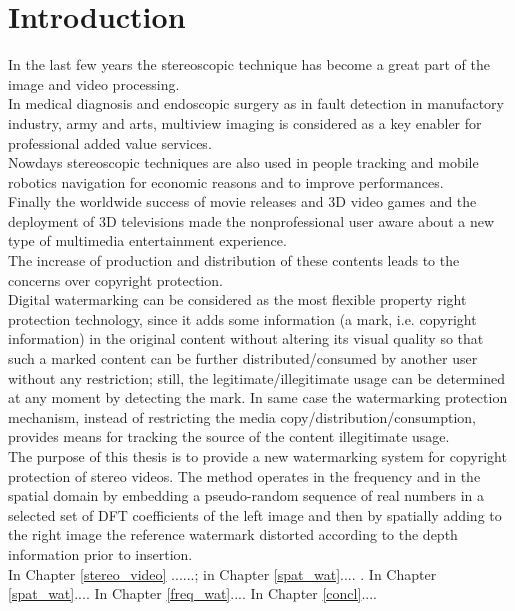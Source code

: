 \chapter*{Introduction}
\label{intro}
{}

In the last few years the stereoscopic technique has become a great part of the image and video processing.\\
In medical diagnosis and endoscopic surgery as in fault detection in manufactory industry, army and arts,
multiview imaging is considered as a key enabler  for professional added value services.\\
Nowdays stereoscopic techniques are also used in people tracking and mobile robotics
navigation for economic reasons and to improve performances.\\
Finally the worldwide success of movie releases and  3D video games and the deployment of 3D televisions made the nonprofessional user aware about a new type of multimedia entertainment experience.\\
The increase of production and distribution of these contents leads to the concerns over copyright protection.\\
Digital watermarking can be considered as the most flexible property right protection technology, since it adds some information (a mark, i.e. copyright information) in the
original content without altering its visual quality so that such a marked content can be further distributed/consumed by another user without any restriction; still, the legitimate/illegitimate usage can be determined at any moment by detecting the mark. In same case the watermarking protection mechanism, instead of restricting the media copy/distribution/consumption, provides means for tracking the source of the content illegitimate usage.\\
The purpose of this thesis is to provide a new watermarking system for copyright protection of stereo videos. The method operates in the frequency and in the spatial domain by embedding a pseudo-random sequence of real numbers in a selected set of DFT coefficients of the left image and then by spatially adding to the right image the reference watermark distorted according to the depth information prior to insertion.\\
In Chapter \ref{stereo_video} ......; in Chapter \ref{spat_wat}.... .
In Chapter \ref{spat_wat}....
In Chapter \ref{freq_wat}....
In Chapter \ref{concl}....